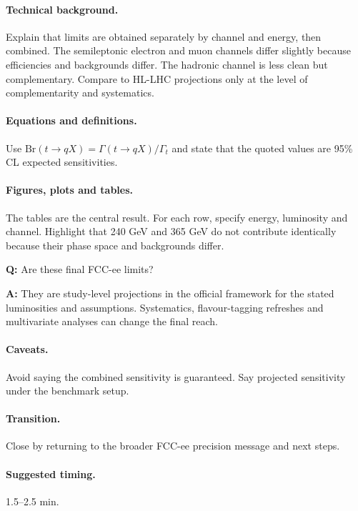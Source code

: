 \documentclass[11pt,a4paper]{report}
\newcommand{\br}{\mathrm{Br}}
\begin{document}
\paragraph{Technical background.}
Explain that limits are obtained separately by channel and energy, then combined.  The semileptonic electron and muon channels differ slightly because efficiencies and backgrounds differ.  The hadronic channel is less clean but complementary.  Compare to HL-LHC projections only at the level of complementarity and systematics.

\paragraph{Equations and definitions.}
Use $\br(t\to qX)=\Gamma(t\to qX)/\Gamma_t$ and state that the quoted values are 95\% CL expected sensitivities.

\paragraph{Figures, plots and tables.}
The tables are the central result.  For each row, specify energy, luminosity and channel.  Highlight that 240 GeV and 365 GeV do not contribute identically because their phase space and backgrounds differ.

\begin{questionbox}
\textbf{Q:} Are these final FCC-ee limits?\par
\textbf{A:} They are study-level projections in the official framework for the stated luminosities and assumptions.  Systematics, flavour-tagging refreshes and multivariate analyses can change the final reach.
\end{questionbox}

\paragraph{Caveats.}
Avoid saying the combined sensitivity is guaranteed.  Say projected sensitivity under the benchmark setup.

\paragraph{Transition.}
Close by returning to the broader FCC-ee precision message and next steps.

\paragraph{Suggested timing.}
1.5--2.5 min.
\end{document}
